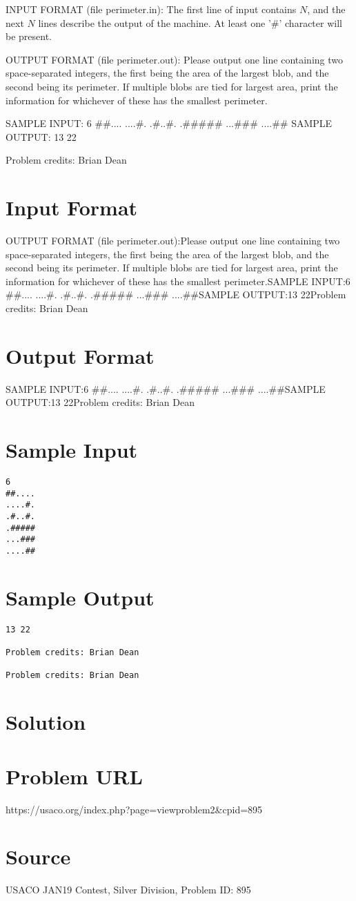 \documentclass[12pt]{article}
\begin{document}
INPUT FORMAT (file perimeter.in):
The first line of input contains $N$, and the next $N$ lines describe the output
of  the machine.  At least one '#' character will be present.

OUTPUT FORMAT (file perimeter.out):
Please output one line containing two space-separated integers, the first being
the area of the largest blob, and the second being its perimeter.  If multiple
blobs are tied for largest area, print the information for whichever of these
has the smallest perimeter.

SAMPLE INPUT:
6
##....
....#.
.#..#.
.#####
...###
....##
SAMPLE OUTPUT: 
13 22


Problem credits: Brian Dean



\section*{Input Format}
OUTPUT FORMAT (file perimeter.out):Please output one line containing two space-separated integers, the first being
the area of the largest blob, and the second being its perimeter.  If multiple
blobs are tied for largest area, print the information for whichever of these
has the smallest perimeter.SAMPLE INPUT:6
##....
....#.
.#..#.
.#####
...###
....##SAMPLE OUTPUT:13 22Problem credits: Brian Dean

\section*{Output Format}
SAMPLE INPUT:6
##....
....#.
.#..#.
.#####
...###
....##SAMPLE OUTPUT:13 22Problem credits: Brian Dean

\section*{Sample Input}
\begin{verbatim}
6
##....
....#.
.#..#.
.#####
...###
....##
\end{verbatim}

\section*{Sample Output}
\begin{verbatim}
13 22

Problem credits: Brian Dean

Problem credits: Brian Dean
\end{verbatim}

\section*{Solution}


\section*{Problem URL}
https://usaco.org/index.php?page=viewproblem2&cpid=895

\section*{Source}
USACO JAN19 Contest, Silver Division, Problem ID: 895
\end{document}
